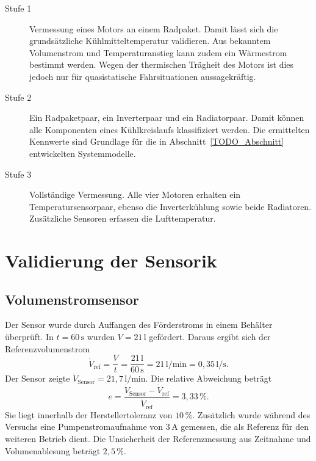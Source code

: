 \begin{description}
    \item[Stufe 1] Vermessung eines Motors an einem Radpaket. Damit lässt sich
          die grundsätzliche Kühlmitteltemperatur validieren. Aus bekanntem
          Volumenstrom und Temperaturanstieg kann zudem ein Wärmestrom
          bestimmt werden. Wegen der thermischen Trägheit des Motors ist
          dies jedoch nur für quasistatische Fahrsituationen aussagekräftig.
    \item[Stufe 2] Ein Radpaketpaar, ein Inverterpaar und ein Radiatorpaar.
          Damit können alle Komponenten eines Kühlkreislaufs klassifiziert
          werden. Die ermittelten Kennwerte sind Grundlage für die in
          Abschnitt~\ref{TODO_Abschnitt} entwickelten Systemmodelle.
    \item[Stufe 3] Vollständige Vermessung. Alle vier Motoren erhalten ein
          Temperatursensorpaar, ebenso die Inverterkühlung sowie beide
          Radiatoren. Zusätzliche Sensoren erfassen die Lufttemperatur.
\end{description}

\section{Validierung der Sensorik}
\label{sec:validierung}

\subsection{Volumenstromsensor}
\label{subsec:val_volumenstrom}

Der Sensor wurde durch Auffangen des Förderstroms
in einem Behälter überprüft. In $t = 60\,\mathrm{s}$ wurden
$V = 21\,\mathrm{l}$ gefördert. Daraus ergibt sich der Referenzvolumenstrom
\begin{equation}
    \dot{V}_\mathrm{ref} = \frac{V}{t}
    = \frac{21\,\mathrm{l}}{60\,\mathrm{s}}
    = 21\,\mathrm{l/min} = 0{,}35\,\mathrm{l/s}.
\end{equation}
Der Sensor zeigte $\dot{V}_\mathrm{Sensor} = 21{,}7\,\mathrm{l/min}$. Die
relative Abweichung beträgt
\begin{equation}
    e = \frac{\dot{V}_\mathrm{Sensor} - \dot{V}_\mathrm{ref}}{\dot{V}_\mathrm{ref}}
    = 3{,}33\,\%.
\end{equation}
Sie liegt innerhalb der Herstellertoleranz von $10\,\%$. Zusätzlich
wurde während des Versuchs eine Pumpenstromaufnahme von $3\,\mathrm{A}$
gemessen, die als Referenz für den weiteren Betrieb dient. Die Unsicherheit
der Referenzmessung aus Zeitnahme und Volumenablesung beträgt $2{,}5\,\%$.

